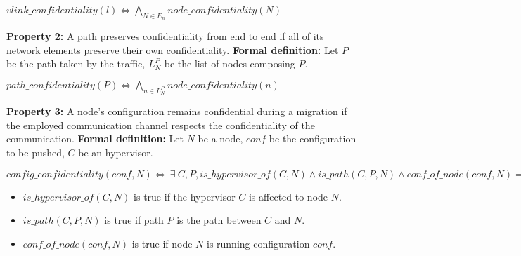 \begin{myformula}
$vlink\_confidentiality(l) \Leftrightarrow \bigwedge\limits_{N\in E_n} node\_confidentiality(N) $
\end{myformula}

\textbf{Property 2:} A path preserves confidentiality from end to end if all of its network elements preserve their own confidentiality.
\newline \textbf{Formal definition:} Let $P$ be the path taken by the traffic, $L_N^P$ be the list of nodes composing $P$.

\begin{myformula}
$path\_confidentiality(P) \Leftrightarrow \bigwedge\limits_{n \in L_N^P}node\_confidentiality(n)$
\end{myformula}


\textbf{Property 3:} A node's configuration remains confidential during a migration if the employed communication channel respects the confidentiality of the communication.
\newline \textbf{Formal definition:} Let $N$ be a node, $conf$ be the configuration to be pushed, $C$ be an hypervisor.
\newline

\begin{myformula}
$config\_confidentiality(conf,N) \Leftrightarrow~\exists~C,P, 
is\_hypervisor\_of(C,N) \wedge is\_path(C,P,N) \wedge  conf\_of\_node(conf,N) \Rightarrow
~path\_confidentiality(P) \wedge  node\_confidentiality(N)
$
\end{myformula}


\begin{itemize}
\item $is\_hypervisor\_of(C,N)$ is true if the hypervisor $C$ is affected to node $N$.  
\item $is\_path(C,P,N)$ is true if path $P$ is the path between $C$ and $N$.
\item $conf\_of\_node(conf, N)$ is true if node $N$ is running configuration $conf$.
\end{itemize}

